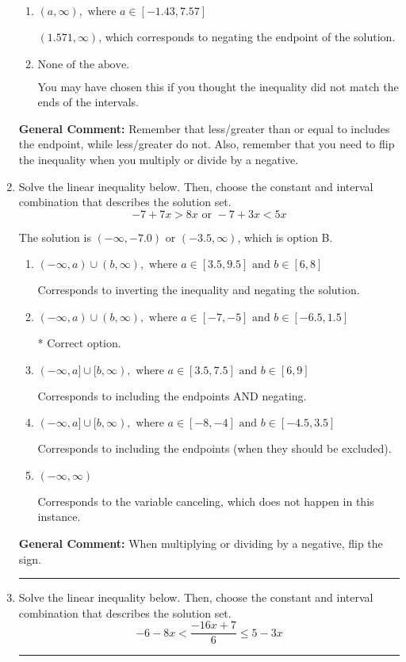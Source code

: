 \documentclass{extbook}[14pt]
\newcommand{\litem}[1]{\item #1

\rule{\textwidth}{0.4pt}}
\begin{document}
\begin{enumerate}
{\begin{enumerate}[label=\Alph*.]
* $(-1.571, \infty)$, which is the correct option.
\item \( (a, \infty), \text{ where } a \in [-1.43, 7.57] \)

 $(1.571, \infty)$, which corresponds to negating the endpoint of the solution.
\item \( \text{None of the above}. \)

You may have chosen this if you thought the inequality did not match the ends of the intervals.
\end{enumerate}

\textbf{General Comment:} Remember that less/greater than or equal to includes the endpoint, while less/greater do not. Also, remember that you need to flip the inequality when you multiply or divide by a negative.
}
\litem{
Solve the linear inequality below. Then, choose the constant and interval combination that describes the solution set.
\[ -7 + 7 x > 8 x \text{ or } -7 + 3 x < 5 x \]

The solution is \( (-\infty, -7.0) \text{ or } (-3.5, \infty) \), which is option B.\begin{enumerate}[label=\Alph*.]
\item \( (-\infty, a) \cup (b, \infty), \text{ where } a \in [3.5, 9.5] \text{ and } b \in [6, 8] \)

Corresponds to inverting the inequality and negating the solution.
\item \( (-\infty, a) \cup (b, \infty), \text{ where } a \in [-7, -5] \text{ and } b \in [-6.5, 1.5] \)

 * Correct option.
\item \( (-\infty, a] \cup [b, \infty), \text{ where } a \in [3.5, 7.5] \text{ and } b \in [6, 9] \)

Corresponds to including the endpoints AND negating.
\item \( (-\infty, a] \cup [b, \infty), \text{ where } a \in [-8, -4] \text{ and } b \in [-4.5, 3.5] \)

Corresponds to including the endpoints (when they should be excluded).
\item \( (-\infty, \infty) \)

Corresponds to the variable canceling, which does not happen in this instance.
\end{enumerate}

\textbf{General Comment:} When multiplying or dividing by a negative, flip the sign.
}
\litem{
Solve the linear inequality below. Then, choose the constant and interval combination that describes the solution set.
\[ -6 - 8 x < \frac{-16 x + 7}{6} \leq 5 - 3 x \]

}
\end{enumerate}
\end{document}
